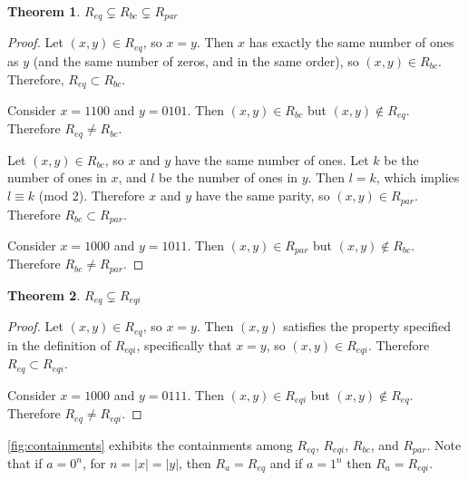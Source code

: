 \documentclass[draft]{article}
\newtheorem{theorem}{Theorem}%
\theoremstyle{definition}
\begin{document}
\begin{theorem}$R_{eq} \subsetneq R_{bc} \subsetneq R_{par}$\end{theorem}
\begin{proof}
  Let $(x, y)\in R_{eq}$, so $x=y$. Then $x$ has exactly the same number of ones
  as $y$ (and the same number of zeros, and in the same order), so $(x, y) \in
  R_{bc}$. Therefore, $R_{eq} \subset R_{bc}$.
 
  Consider $x=1100$ and $y=0101$. Then $(x, y)\in R_{bc}$ but $(x, y) \notin
  R_{eq}$. Therefore $R_{eq} \neq R_{bc}$.

  Let $(x, y)\in R_{bc}$, so $x$ and $y$ have the same number of ones. Let $k$
  be the number of ones in $x$, and $l$ be the number of ones in $y$. Then
  $l=k$, which implies $l \equiv k$ (mod 2). Therefore $x$ and $y$ have
  the same parity, so $(x, y)\in R_{par}$. Therefore $R_{bc} \subset R_{par}$.

  Consider $x=1000$ and $y=1011$. Then $(x, y)\in R_{par}$ but $(x, y) \notin
  R_{bc}$. Therefore $R_{bc} \neq R_{par}$.
\end{proof}

\begin{theorem}$R_{eq} \subsetneq R_{eqi}$\end{theorem}
\begin{proof}
  Let $(x, y)\in R_{eq}$, so $x=y$. Then $(x, y)$ satisfies the property
  specified in the definition of $R_{eqi}$, specifically that $x=y$, so
  $(x, y) \in R_{eqi}$. Therefore $R_{eq} \subset R_{eqi}$.

  Consider $x=1000$ and $y=0111$. Then $(x, y)\in R_{eqi}$ but $(x, y) \notin
  R_{eq}$. Therefore $R_{eq} \neq R_{eqi}$.
\end{proof}

\autoref{fig:containments} exhibits the containments among $R_{eq}$, $R_{eqi}$,
$R_{bc}$, and $R_{par}$. Note that if $a=0^n$, for $n=|x|=|y|$, then
$R_{a}=R_{eq}$ and if $a=1^n$ then $R_{a}=R_{eqi}$.
\end{document}
